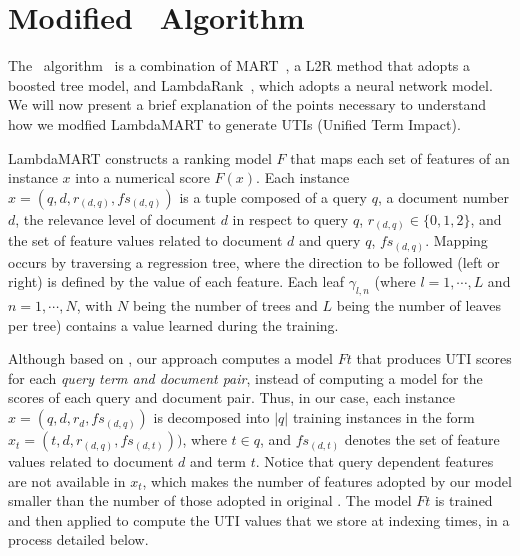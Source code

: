 \documentclass[preprint,review,10pt,3p]{elsarticle}
\begin{document}



\section{Modified \lambdamart\ Algorithm}
\label{lambda}
\newcommand{\lamdamart}{LambdaMART}

The \lambdamart\ algorithm~\cite{wu2010lambdamart} is a combination of
MART~\cite{Jerome2001}, a L2R method that adopts a boosted tree model, and LambdaRank~\cite{Burges2006},
which adopts a neural network model. 
We will
now present a brief explanation of the points necessary to understand
how we modfied LambdaMART to generate UTIs (Unified Term Impact).

LambdaMART constructs a ranking model $F$ that maps
each set of features of an instance $x$ into a numerical score $F(x)$. Each instance $x=(q,d,r_{(d,q)},fs_{(d,q)})$ is a tuple composed of a query $q$, a document number $d$, the relevance level of document $d$ in respect to query $q$, $r_{(d,q)} \in \{0,1,2\}$, and the set of feature values related to document $d$ and query $q$, $fs_{(d,q)}$.   Mapping occurs by traversing a regression tree, where the direction to be followed (left or right) is defined by the value of each feature. Each leaf $\gamma_{l,n}$ (where $l=1,\cdots,L$ and $n=1,\cdots,N$, with $N$ being the number of trees and $L$ being the number of leaves per tree) contains a value learned during the training.

Although based on \lambdamart, our approach computes a model $Ft$
that produces UTI scores for each \emph{query term and document pair}, instead of computing a model for the scores of each query and document pair. Thus, in our case, each instance $x=(q,d,r_d,fs_{(d,q)})$ is
decomposed into $|q|$ training instances in the form $x_t=
(t,d,r_{(d,q)},fs_{(d,t)}))$, where $t \in q$, and $fs_{(d,t)}$ denotes the
set of feature values related to document $d$ and term $t$. Notice
that query dependent features are not available in $x_t$, which makes
the number of features adopted by our model smaller than the number of those
adopted in original \lambdamart. The model $Ft$ is trained and then
applied to compute the UTI values that we store at indexing times, in a process detailed below.
\end{document}

